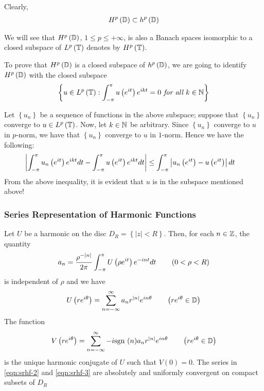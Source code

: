 Clearly, 
\begin{align*}
    H^{p} \left( \mathbb D \right) \subset h ^{p} \left( \mathbb D \right)
\end{align*}

We will see that $H ^{p} \left( \mathbb D \right)$, $1\le p \le +\infty$, is also a Banach spaces isomorphic to a closed subspace of $L^{p} \left( \mathbb T \right)$ denotes by $H^{p} \left( \mathbb T \right)$.

To prove that $H^{p} \left( \mathbb D \right)$ is a closed subspace of $h^{p} \left( \mathbb D \right)$, we are going to identify $H^{p} \left( \mathbb D \right)$ with the closed subspace
\begin{align*}
    \left\{ u\in L^{p} \left( \mathbb T \right) : \int_{-\pi}^{\pi} u\left( e^{it} \right) e^{ikt} = 0 \textit{ for all } k \in \mathbb N \right\}
\end{align*}

Let $\left\{ u_{n} \right\}$ be a sequence of functions in the above subspace; suppose that $\left\{ u_{n} \right\}$ converge to $u\in L^{p} \left( \mathbb T \right)$. Now, let $k\in \mathbb N$ be arbitrary. Since $\left\{ u_{n} \right\}$ converge to $u$ in $p$-norm, we have that $\left\{ u_{n} \right\}$ converge to $u$ in $1$-norm. Hence we have the following:
\begin{align*}
    \left\lvert \int_{-\pi}^{\pi} u_{n} \left( e^{it} \right) e^{ikt} dt - \int_{-\pi}^{\pi} u \left( e^{it} \right) e^{ikt} dt  \right\rvert &\le \int_{-\pi}^{\pi} \left\lvert u_{n} \left( e^{it} \right) - u\left( e^{it} \right) \right\rvert dt
\end{align*}
From the above inequality, it is evident that $u$ is in the subspace mentioned above!

\subsubsection{Series Representation of Harmonic Functions}

\begin{theorem}
    Let $U$ be a harmonic on the disc $D_{R} = \left\{ |z| < R \right\}$. Then, for each $n\in \mathbb Z$, the quantity
    \begin{equation}
	a_{n} = \frac{\rho^{-\left\lvert n \right\rvert}}{2\pi} \int_{-\pi}^{\pi} U\left( \rho e^{it} \right) e^{-int} dt \qquad \left( 0 < \rho < R \right)
	\label{eqn:srhf-1}
    \end{equation}
    is independent of $\rho$ and we have
    \begin{equation}
	U\left( re^{i\theta} \right) = \sum_{n=-\infty}^{\infty} a_{n} r^{\left\lvert n \right\rvert} e^{in\theta} \qquad \left( re^{i\theta} \in \mathbb D \right)
	\label{eqn:srhf-2}
    \end{equation}
    The function
    \begin{equation}
	V\left( re^{i\theta} \right) = \sum_{n=-\infty}^{\infty} -i \text{sgn } (n) a_{n} r^{\left\lvert n \right\rvert} e^{in\theta} \qquad \left( re^{i\theta} \in \mathbb D \right)
	\label{eqn:srhf-3}
    \end{equation}
    is the unique harmonic conjugate of $U$ such that $V\left( 0 \right)  = 0$. The series in \ref{eqn:srhf-2} and \ref{eqn:srhf-3} are absolutely and uniformly convergent on compact subsets of $D_{R}$
    \label{thm:srhf}
\end{theorem}
